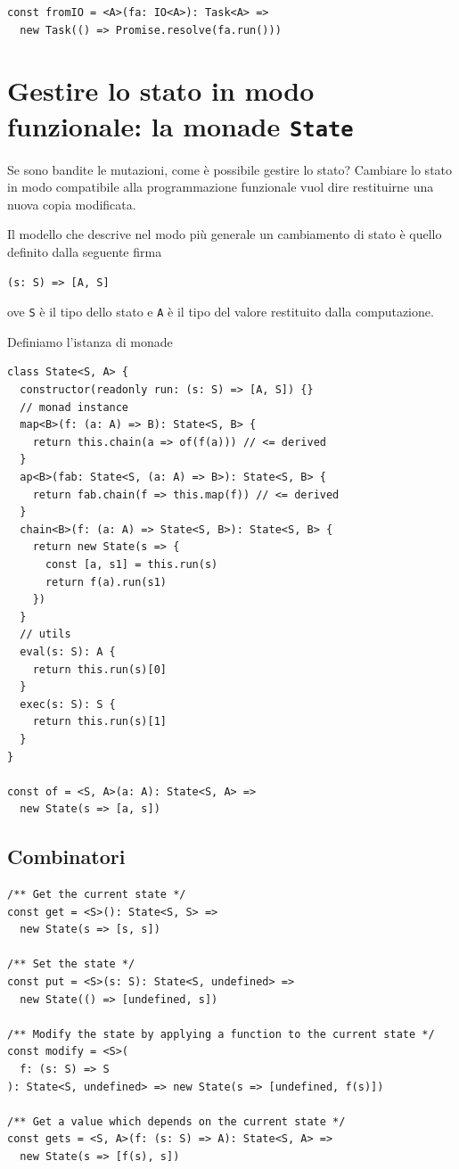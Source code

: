 \documentclass[12pt]{article}
\begin{document}
\begin{verbatim}
const fromIO = <A>(fa: IO<A>): Task<A> =>
  new Task(() => Promise.resolve(fa.run()))
\end{verbatim}

\newpage

\section{Gestire lo stato in modo funzionale: la monade \texttt{State}}

Se sono bandite le mutazioni, come è possibile gestire lo stato?
Cambiare lo stato in modo compatibile alla programmazione funzionale vuol dire restituirne una nuova copia modificata.

Il modello che descrive nel modo più generale un cambiamento di stato è quello definito dalla seguente firma

\begin{verbatim}
(s: S) => [A, S]
\end{verbatim}

ove \texttt{S} è il tipo dello stato e \texttt{A} è il tipo del valore restituito dalla computazione.

Definiamo l'istanza di monade

\begin{verbatim}
class State<S, A> {
  constructor(readonly run: (s: S) => [A, S]) {}
  // monad instance
  map<B>(f: (a: A) => B): State<S, B> {
    return this.chain(a => of(f(a))) // <= derived
  }
  ap<B>(fab: State<S, (a: A) => B>): State<S, B> {
    return fab.chain(f => this.map(f)) // <= derived
  }
  chain<B>(f: (a: A) => State<S, B>): State<S, B> {
    return new State(s => {
      const [a, s1] = this.run(s)
      return f(a).run(s1)
    })
  }
  // utils
  eval(s: S): A {
    return this.run(s)[0]
  }
  exec(s: S): S {
    return this.run(s)[1]
  }
}

const of = <S, A>(a: A): State<S, A> =>
  new State(s => [a, s])
\end{verbatim}

\subsection{Combinatori}

\begin{verbatim}
/** Get the current state */
const get = <S>(): State<S, S> =>
  new State(s => [s, s])

/** Set the state */
const put = <S>(s: S): State<S, undefined> =>
  new State(() => [undefined, s])

/** Modify the state by applying a function to the current state */
const modify = <S>(
  f: (s: S) => S
): State<S, undefined> => new State(s => [undefined, f(s)])

/** Get a value which depends on the current state */
const gets = <S, A>(f: (s: S) => A): State<S, A> =>
  new State(s => [f(s), s])
\end{verbatim}
\end{document}
